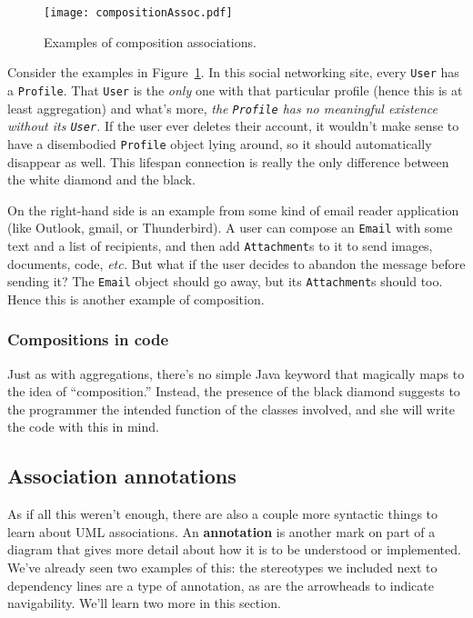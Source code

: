 \begin{figure}[ht]
\centering
\texttt{[image: compositionAssoc.pdf]}   %
\caption{Examples of composition associations.}
\label{fig:compositionAssoc}
\end{figure}


Consider the examples in Figure~\ref{fig:compositionAssoc}. In this social
networking site, every \texttt{User} has a \texttt{Profile}. That
\texttt{User} is the \textit{only} one with that particular profile (hence
this is at least aggregation) and what's more, \textit{the \texttt{Profile}
has no meaningful existence without its \texttt{User}.} If the user ever
deletes their account, it wouldn't make sense to have a disembodied
\texttt{Profile} object lying around, so it should automatically disappear as
well. This lifespan connection is really the only difference between the white
diamond and the black.

On the right-hand side is an example from some kind of email reader
application (like Outlook, gmail, or Thunderbird). A user can compose an
\texttt{Email} with some text and a list of recipients, and then add
\texttt{Attachment}s to it to send images, documents, code, \textit{etc.} But
what if the user decides to abandon the message before sending it? The
\texttt{Email} object should go away, but its \texttt{Attachment}s should too.
Hence this is another example of composition.

\subsubsection{Compositions in code}

Just as with aggregations, there's no simple Java keyword that magically maps
to the idea of ``composition.'' Instead, the presence of the black diamond
suggests to the programmer the intended function of the classes involved, and
she will write the code with this in mind.


\subsection{Association annotations}

As if all this weren't enough, there are also a couple more syntactic things
to learn about UML associations. An \textbf{annotation} is another mark on
part of a diagram that gives more detail about how it is to be understood or
implemented. We've already seen two examples of this: the stereotypes we
included next to dependency lines are a type of annotation, as are the
arrowheads to indicate navigability. We'll learn two more in this section.

